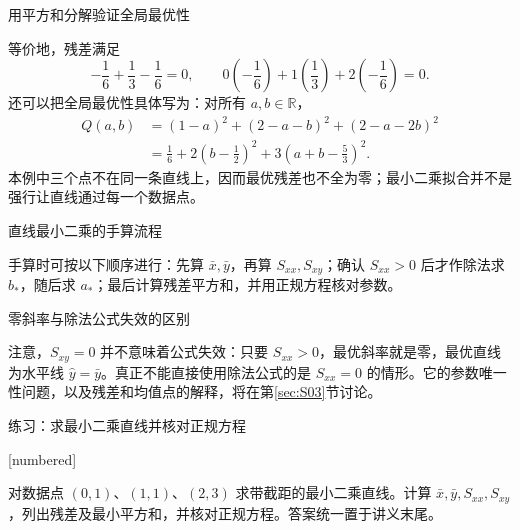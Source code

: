 \documentclass[aspectratio=169,10pt,fontset=fandol]{ctexbeamer}
\makeatletter
\newcommand{\mathagentexerciselabelcontext}[1]{%
\hypertarget<1>{#1}{}%
\edef\@currentHref{#1}%
}
\makeatother
\begin{document}
\begin{frame}[t,fragile]{用平方和分解验证全局最优性}
\footnotesize
{\footnotesize
等价地，残差满足
\[
-\frac16+\frac13-\frac16=0,\qquad
0\left(-\frac16\right)+1\left(\frac13\right)+2\left(-\frac16\right)=0.
\]
还可以把全局最优性具体写为：对所有 $a,b\in\mathbb{R}$，
\[
\begin{aligned}
Q(a,b)&=(1-a)^2+(2-a-b)^2+(2-a-2b)^2\\
&=\frac16+2\left(b-\frac12\right)^2+3\left(a+b-\frac53\right)^2.
\end{aligned}
\]
本例中三个点不在同一条直线上，因而最优残差也不全为零；最小二乘拟合并不是强行让直线通过每一个数据点。\par

}
\end{frame}
\begin{frame}[t,fragile]{直线最小二乘的手算流程}
\footnotesize
{\footnotesize
手算时可按以下顺序进行：先算 $\bar{x},\bar{y}$，再算 $S_{xx},S_{xy}$；确认 $S_{xx}>0$ 后才作除法求 $b_*$，随后求 $a_*$；最后计算残差平方和，并用正规方程核对参数。


}
\end{frame}
\begin{frame}[t,fragile]{零斜率与除法公式失效的区别}
\footnotesize
{\footnotesize
注意，$S_{xy}=0$ 并不意味着公式失效：只要 $S_{xx}>0$，最优斜率就是零，最优直线为水平线 $\hat{y}=\bar{y}$。真正不能直接使用除法公式的是 $S_{xx}=0$ 的情形。它的参数唯一性问题，以及残差和均值点的解释，将在第\ref{sec:S03}节讨论。\par

}
\end{frame}
\begin{frame}[t,fragile]{练习：求最小二乘直线并核对正规方程}
\normalsize
{\normalsize
[numbered]
\mathagentexerciselabelcontext{mathagent.exercise.U0028.0}
\begin{exercise}
\label{mathagent:exercise:332ae2e99c79cf97370ba4732967ff23f2a2c4a4b36b98eda8e910755bf43b8b}
对数据点 $(0,1)$、$(1,1)$、$(2,3)$ 求带截距的最小二乘直线。计算 $\bar{x},\bar{y},S_{xx},S_{xy}$，列出残差及最小平方和，并核对正规方程。答案统一置于讲义末尾。
\end{exercise}
}
\end{frame}
\end{document}
